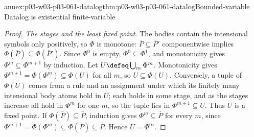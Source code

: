 \begin{annexitem}{annex:p03-w03-p03-061-datalog}{thm:p03-w03-p03-061-datalog}{Bounded-variable Datalog is existential finite-variable}
\begin{proof}
\emph{The stages and the least fixed point.} The bodies contain the
intensional symbols only positively, so \(\Phi\) is monotone:
\(\bar P\subseteq\bar P'\) componentwise implies
\(\Phi(\bar P)\subseteq\Phi(\bar P')\). Since \(\Phi^0\) is empty,
\(\Phi^0\subseteq\Phi^1\), and monotonicity gives
\(\Phi^m\subseteq\Phi^{m+1}\) by induction. Let \(U\defeq\bigcup_m\Phi^m\).
Monotonicity gives \(\Phi^{m+1}=\Phi(\Phi^m)\subseteq\Phi(U)\) for all
\(m\), so \(U\subseteq\Phi(U)\). Conversely, a tuple of \(\Phi(U)\) comes from
a rule and an assignment under which its finitely many intensional body atoms
hold in \(U\); each holds in some stage, and as the stages increase all hold
in \(\Phi^m\) for one \(m\), so the tuple lies in \(\Phi^{m+1}\subseteq U\).
Thus \(U\) is a fixed point. If \(\Phi(\bar P)\subseteq\bar P\), induction
gives \(\Phi^m\subseteq\bar P\) for every \(m\), since
\(\Phi^{m+1}=\Phi(\Phi^m)\subseteq\Phi(\bar P)\subseteq\bar P\). Hence
\(U=\Phi^\infty\).


\end{proof}
\end{annexitem}
